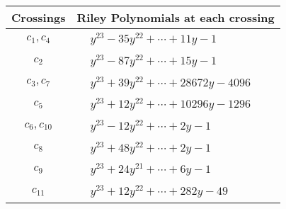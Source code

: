 \documentclass[1p]{elsarticle_modified}
\theoremstyle{definition}
\begin{document}
\begin{tabular}{m{50pt}|m{274pt}}
Crossings & \hspace{64pt}Riley Polynomials at each crossing \\
\hline $$\begin{aligned}c_{1},c_{4}\end{aligned}$$&$\begin{aligned}
&y^{23}-35 y^{22}+\cdots+11 y-1
\end{aligned}$\\
\hline $$\begin{aligned}c_{2}\end{aligned}$$&$\begin{aligned}
&y^{23}-87 y^{22}+\cdots+15 y-1
\end{aligned}$\\
\hline $$\begin{aligned}c_{3},c_{7}\end{aligned}$$&$\begin{aligned}
&y^{23}+39 y^{22}+\cdots+28672 y-4096
\end{aligned}$\\
\hline $$\begin{aligned}c_{5}\end{aligned}$$&$\begin{aligned}
&y^{23}+12 y^{22}+\cdots+10296 y-1296
\end{aligned}$\\
\hline $$\begin{aligned}c_{6},c_{10}\end{aligned}$$&$\begin{aligned}
&y^{23}-12 y^{22}+\cdots+2 y-1
\end{aligned}$\\
\hline $$\begin{aligned}c_{8}\end{aligned}$$&$\begin{aligned}
&y^{23}+48 y^{22}+\cdots+2 y-1
\end{aligned}$\\
\hline $$\begin{aligned}c_{9}\end{aligned}$$&$\begin{aligned}
&y^{23}+24 y^{21}+\cdots+6 y-1
\end{aligned}$\\
\hline $$\begin{aligned}c_{11}\end{aligned}$$&$\begin{aligned}
&y^{23}+12 y^{22}+\cdots+282 y-49
\end{aligned}$\\
\hline
\end{tabular}\\~\\
\end{document}
